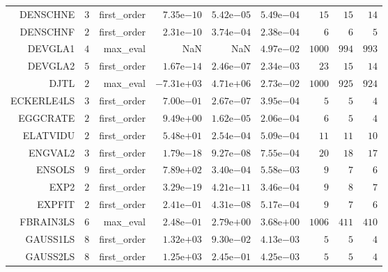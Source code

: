 \begin{longtable}{rrrrrrrrr}
DENSCHNE & \(     3\) & first\_order & \( 7.35\)e\(-10\) & \( 5.42\)e\(-05\) & \( 5.49\)e\(-04\) & \(    15\) & \(    15\) & \(    14\) \\
DENSCHNF & \(     2\) & first\_order & \( 2.31\)e\(-10\) & \( 3.74\)e\(-04\) & \( 2.38\)e\(-04\) & \(     6\) & \(     6\) & \(     5\) \\
DEVGLA1 & \(     4\) & max\_eval &       NaN &       NaN & \( 4.97\)e\(-02\) & \(  1000\) & \(   994\) & \(   993\) \\
DEVGLA2 & \(     5\) & first\_order & \( 1.67\)e\(-14\) & \( 2.46\)e\(-07\) & \( 2.34\)e\(-03\) & \(    23\) & \(    15\) & \(    14\) \\
DJTL & \(     2\) & max\_eval & \(-7.31\)e\(+03\) & \( 4.71\)e\(+06\) & \( 2.73\)e\(-02\) & \(  1000\) & \(   925\) & \(   924\) \\
ECKERLE4LS & \(     3\) & first\_order & \( 7.00\)e\(-01\) & \( 2.67\)e\(-07\) & \( 3.95\)e\(-04\) & \(     5\) & \(     5\) & \(     4\) \\
EGGCRATE & \(     2\) & first\_order & \( 9.49\)e\(+00\) & \( 1.62\)e\(-05\) & \( 2.06\)e\(-04\) & \(     6\) & \(     5\) & \(     4\) \\
ELATVIDU & \(     2\) & first\_order & \( 5.48\)e\(+01\) & \( 2.54\)e\(-04\) & \( 5.09\)e\(-04\) & \(    11\) & \(    11\) & \(    10\) \\
ENGVAL2 & \(     3\) & first\_order & \( 1.79\)e\(-18\) & \( 9.27\)e\(-08\) & \( 7.55\)e\(-04\) & \(    20\) & \(    18\) & \(    17\) \\
ENSOLS & \(     9\) & first\_order & \( 7.89\)e\(+02\) & \( 3.40\)e\(-04\) & \( 5.58\)e\(-03\) & \(     9\) & \(     7\) & \(     6\) \\
EXP2 & \(     2\) & first\_order & \( 3.29\)e\(-19\) & \( 4.21\)e\(-11\) & \( 3.46\)e\(-04\) & \(     9\) & \(     8\) & \(     7\) \\
EXPFIT & \(     2\) & first\_order & \( 2.41\)e\(-01\) & \( 4.31\)e\(-08\) & \( 5.17\)e\(-04\) & \(     9\) & \(     7\) & \(     6\) \\
FBRAIN3LS & \(     6\) & max\_eval & \( 2.48\)e\(-01\) & \( 2.79\)e\(+00\) & \( 3.68\)e\(+00\) & \(  1006\) & \(   411\) & \(   410\) \\
GAUSS1LS & \(     8\) & first\_order & \( 1.32\)e\(+03\) & \( 9.30\)e\(-02\) & \( 4.13\)e\(-03\) & \(     5\) & \(     5\) & \(     4\) \\
GAUSS2LS & \(     8\) & first\_order & \( 1.25\)e\(+03\) & \( 2.45\)e\(-01\) & \( 4.25\)e\(-03\) & \(     5\) & \(     5\) & \(     4\) \\

\end{longtable}
